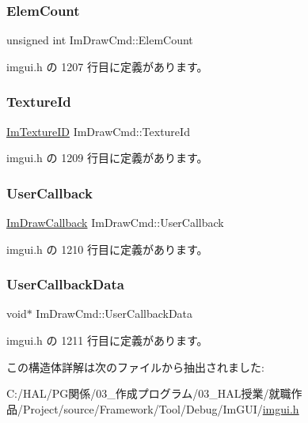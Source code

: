 \subsubsection{\texorpdfstring{Elem\+Count}{ElemCount}}
{\footnotesize\ttfamily unsigned int Im\+Draw\+Cmd\+::\+Elem\+Count}



 imgui.\+h の 1207 行目に定義があります。

\mbox{\label{struct_im_draw_cmd_a4f3b5985ece9ca6b71e7a8e7d85a82e5}} 
\subsubsection{\texorpdfstring{Texture\+Id}{TextureId}}
{\footnotesize\ttfamily \mbox{\hyperlink{imgui_8h_a364f4447ecbc4ca176145ccff9db6286}{Im\+Texture\+ID}} Im\+Draw\+Cmd\+::\+Texture\+Id}



 imgui.\+h の 1209 行目に定義があります。

\mbox{\label{struct_im_draw_cmd_ad26dac4e939f5c4bb892cbca0f9e3af8}} 
\subsubsection{\texorpdfstring{User\+Callback}{UserCallback}}
{\footnotesize\ttfamily \mbox{\hyperlink{imgui_8h_a232a477233f9e3ab7640720bf94674de}{Im\+Draw\+Callback}} Im\+Draw\+Cmd\+::\+User\+Callback}



 imgui.\+h の 1210 行目に定義があります。

\mbox{\label{struct_im_draw_cmd_ae2f5a0baf4a0b25942237b8ce6adb42d}} 
\subsubsection{\texorpdfstring{User\+Callback\+Data}{UserCallbackData}}
{\footnotesize\ttfamily void$\ast$ Im\+Draw\+Cmd\+::\+User\+Callback\+Data}



 imgui.\+h の 1211 行目に定義があります。



この構造体詳解は次のファイルから抽出されました\+:\begin{DoxyCompactItemize}
\item 
C\+:/\+H\+A\+L/\+P\+G関係/03\+\_\+作成プログラム/03\+\_\+\+H\+A\+L授業/就職作品/\+Project/source/\+Framework/\+Tool/\+Debug/\+Im\+G\+U\+I/\mbox{\hyperlink{imgui_8h}{imgui.\+h}}\end{DoxyCompactItemize}
